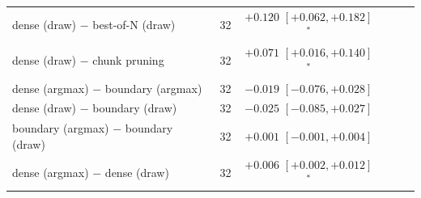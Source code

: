 \begin{tabular}{llcccc}
dense (draw) $-$ best-of-N (draw) & 32 & $+0.120$ $[+0.062, +0.182]$$^*$ & & & \\
dense (draw) $-$ chunk pruning & 32 & $+0.071$ $[+0.016, +0.140]$$^*$ & & & \\
dense (argmax) $-$ boundary (argmax) & 32 & $-0.019$ $[-0.076, +0.028]$ & & & \\
dense (draw) $-$ boundary (draw) & 32 & $-0.025$ $[-0.085, +0.027]$ & & & \\
boundary (argmax) $-$ boundary (draw) & 32 & $+0.001$ $[-0.001, +0.004]$ & & & \\
dense (argmax) $-$ dense (draw) & 32 & $+0.006$ $[+0.002, +0.012]$$^*$ & & & \\
\bottomrule
\end{tabular}

